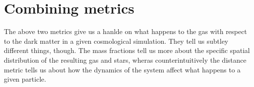 \section{Combining metrics}

The above two metrics give us a hanlde on what happens to the gas with respect to the dark matter in a given cosmological simulation. They tell us subtley different things, though. The mass fractions tell us more about the specific spatial distribution of the resulting gas and stars, wheras counterintuitively the distance metric tells us about how the dynamics of the system affect what happens to a given particle.
